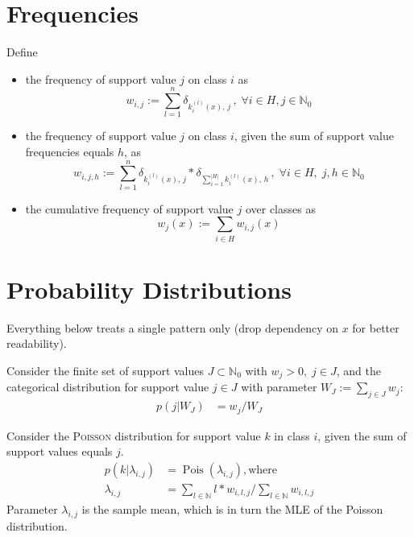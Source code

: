 \documentclass[a4paper,10pt]{article}
\begin{document}
\section{Frequencies}
Define
\begin{itemize}
  \item the frequency of support value $j$ on class $i$ as 
    \begin{equation}
        w_{i,j}:=\sum_{l=1}^n \delta_{k_i^{(l)}(x),\, j}\, , \; \forall i \in H, j \in \mathbb{N}_0
    \end{equation}
  \item the frequency of support value $j$ on class $i$, given the sum of support value frequencies equals $h$, as 
    \begin{equation}
      w_{i,j,h}:=\sum_{l=1}^n \delta_{k_i^{(l)}(x),\, j} * \delta_{\sum_{i=1}^{\vert H \vert}k_i^{(l)}(x),\, h}\, , \; \forall i \in H, \; j,h \in \mathbb{N}_0
    \end{equation}
  \item the cumulative frequency of support value $j$ over classes as 
    \begin{equation}
      w_j(x):=\sum_{i \in H}w_{i,j}(x)
    \end{equation}
\end{itemize}

\section{Probability Distributions}
Everything below treats a single pattern only (drop dependency on $x$ for better readability).

Consider the finite set of support values $J \subset \mathbb{N}_0$ with $w_j > 0, \; j \in J$, and the categorical distribution for support value $j \in J$ with parameter $W_J:=\sum_{j \in J} w_j$:
\begin{align}
  p(j|W_J) &= w_j/W_J
\end{align}

Consider the \textsc{Poisson} distribution for support value $k$ in class $i$, given the sum of support values equals $j$.
\begin{align}
  p(k\vert\lambda_{i,j}) &= \operatorname{Pois}\left(\lambda_{i,j}\right), \text{where}\\
  \lambda_{i,j}&=\sum_{l \in \mathbb{N}} l*w_{i,l,j} / \sum_{l \in \mathbb{N}} w_{i,l,j}
\end{align}
Parameter $\lambda_{i,j}$ is the sample mean, which is in turn the MLE of the Poisson distribution.
\end{document}
